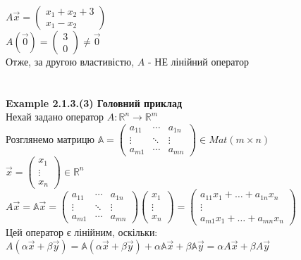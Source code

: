 \documentclass[a4paper, 14pt]{extarticle}
\def\huge{\displaystyle}
\def\ex#1{\textbf{Example {#1}}}
\begin{document}
	$\huge A\vec{x} = \begin{pmatrix} x_1 + x_2 + 3 \\ x_1 -x_2 \end{pmatrix}$\\
	$A(\vec{0}) = \begin{pmatrix} 3 \\ 0 \end{pmatrix} \neq \vec{0}$\\
	Отже, за другою властивістю, $A$ - НЕ лінійний оператор\\
	\\
	\\
	\ex{2.1.3.(3) Головний приклад}\\
	Нехай задано оператор $A: \mathbb{R}^n \to \mathbb{R}^m$\\
	Розглянемо матрицю $\huge \mathbb{A} = \begin{pmatrix}
	a_{11} & \cdots &  a_{1n} \\
	\vdots & \ddots & \vdots \\
	a_{m1} & \cdots & a_{mn}
	\end{pmatrix} \in Mat(m \times n)
	$\\
	$\vec{x} = \begin{pmatrix} x_1 \\ \vdots \\ x_n \end{pmatrix} \in \mathbb{R}^n$\\
	$A\vec{x} = \mathbb{A}\vec{x} = \begin{pmatrix}
	a_{11} & \cdots &  a_{1n} \\
	\vdots & \ddots & \vdots \\
	a_{m1} & \cdots & a_{mn}
	\end{pmatrix} \begin{pmatrix} x_1 \\ \vdots \\ x_n \end{pmatrix} = 
	\begin{pmatrix}
	a_{11}x_1 + \dots + a_{1n}x_n \\
	\vdots \\
	a_{m1}x_1 + \dots + a_{mn}x_n
	\end{pmatrix}
	$\\
	Цей оператор є лінійним, оскільки:\\
	$A(\alpha \vec{x} + \beta \vec{y}) = \mathbb{A}(\alpha \vec{x} + \beta \vec{y})+ \alpha \mathbb{A} \vec{x} + \beta \mathbb{A} \vec{y} = \alpha A \vec{x} + \beta A \vec{y}$\\
\end{document}
